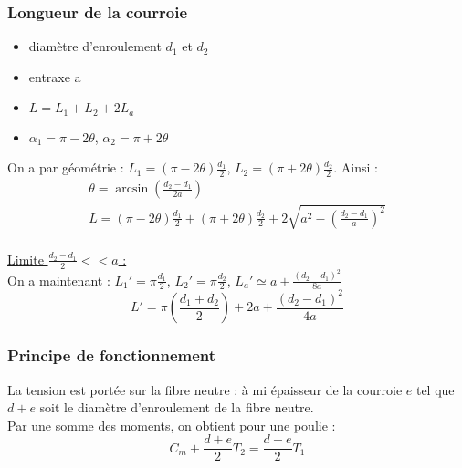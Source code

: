 \documentclass[../main.tex]{subfiles}
\begin{document}
\subsubsection{Longueur de la courroie}
\begin{itemize}
    \item diamètre d'enroulement $d_1$ et $d_2$\\
    \item entraxe a\\
    \item $L = L_1 + L_2 + 2 L_a$\\
    \item $\alpha_1 = \pi - 2\theta$, $\alpha_2 = \pi + 2\theta$\\
\end{itemize}
On a par géométrie : $L_1 = (\pi-2\theta) \frac{d_1}{2}$, $L_2 = (\pi + 2\theta) \frac{d_2}{2}$. Ainsi : \\
\begin{equation}
    \begin{gathered}
        \theta = \arcsin{(\frac{d_2-d_1}{2a})}\\
        L = (\pi - 2\theta) \frac{d_1}{2} + (\pi + 2\theta) \frac{d_2}{2} + 2 \sqrt{a^2 - (\frac{d_2-d_1}{a})^2}\\
    \end{gathered}
\end{equation}

\quad \underline{Limite $\frac{d_2-d_1}{2}<<a$ :}\\
On a maintenant : $L_1'= \pi \frac{d_1}{2}$, $L_2' = \pi \frac{d_2}{2}$, $L_a' \simeq a + \frac{(d_2-d_1)^2}{8a}$\\

\begin{equation}
    L' = \pi (\frac{d_1+d_2}{2})+ 2a + \frac{(d_2-d_1)^2}{4a}
\end{equation}

\subsubsection{Principe de fonctionnement}
La tension est portée sur la fibre neutre : à mi épaisseur de la courroie $e$ tel que $d+e$ soit le diamètre d'enroulement de la fibre neutre. \\
Par une somme des moments, on obtient pour une poulie : \begin{equation}
    C_m + \frac{d+e}{2}T_2 = \frac{d+e}{2}T_1
\end{equation}
\end{document}

